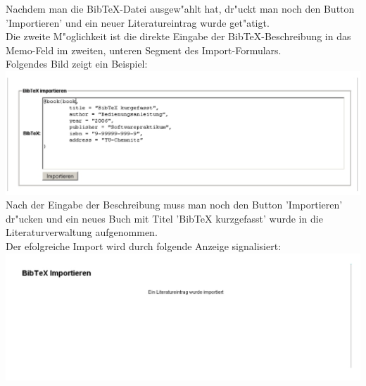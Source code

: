 Nachdem man die BibTeX-Datei ausgew"ahlt hat, dr"uckt man noch den Button 'Importieren' und ein neuer Literatureintrag wurde get"atigt.\\[0.4cm]
Die zweite M"oglichkeit ist die direkte Eingabe der BibTeX-Beschreibung in das Memo-Feld im zweiten, unteren Segment des Import-Formulars.\\
Folgendes Bild zeigt ein Beispiel:\\
\includegraphics[scale=0.8]{import2}\\
Nach der Eingabe der Beschreibung muss man noch den Button 'Importieren' dr"ucken und ein neues Buch mit Titel 'BibTeX kurzgefasst' wurde in die Literaturverwaltung aufgenommen.\\
Der efolgreiche Import wird durch folgende Anzeige signalisiert:\\
\includegraphics[scale=0.8]{import_succ}\\

